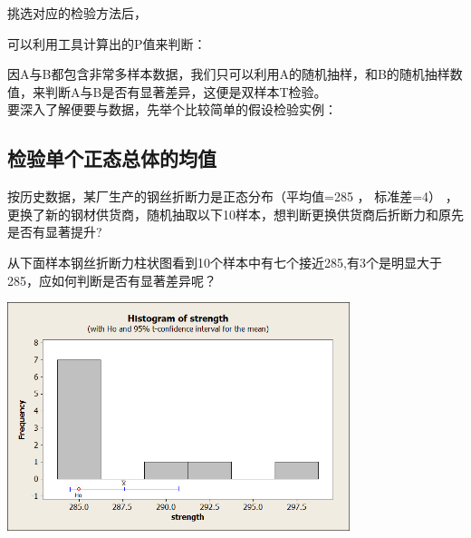 挑选对应的检验方法后，

可以利用工具计算出的P值来判断：

\begin{description}
\item[]
\end{description}



因A与B都包含非常多样本数据，我们只可以利用A的随机抽样，和B的随机抽样数值，来判断A与B是否有显著差异，这便是双样本T检验。 \\
要深入了解便要与数据，先举个比较简单的假设检验实例：\\

\hypertarget{ux68c0ux9a8cux5355ux4e2aux6b63ux6001ux603bux4f53ux7684ux5747ux503c}{%
\subsection{检验单个正态总体的均值}\label{ux68c0ux9a8cux5355ux4e2aux6b63ux6001ux603bux4f53ux7684ux5747ux503c}}

按历史数据，某厂生产的钢丝折断力是正态分布（平均值=285 ， 标准差=4） ，
更换了新的钢材供货商，随机抽取以下10样本，想判断更换供货商后折断力和原先是否有显著提升?

\begin{description}
\item[]
\end{description}

从下面样本钢丝折断力柱状图看到10个样本中有七个接近285,有3个是明显大于285，应如何判断是否有显著差异呢？

\includegraphics[width=10cm]{1sigmaUnknownHistogram_of_strength.jpg}

